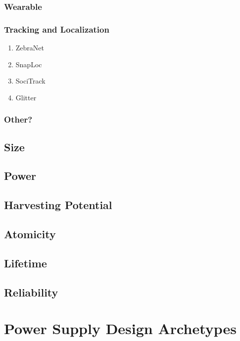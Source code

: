 \subsubsection{Wearable}
\subsubsection{Tracking and Localization}
\begin{enumerate}
    \item ZebraNet ~\cite{juang2002energy}
    \item SnapLoc ~\cite{grossiwindhager2019snaploc}
    \item SociTrack ~\cite{biri2020socitrack}
    \item Glitter ~\cite{sharma2020all}
\end{enumerate}
\subsubsection{Other?}

\subsection{Size}

\subsection{Power}

\subsection{Harvesting Potential}

\subsection{Atomicity}

\subsection{Lifetime}

\subsection{Reliability}





\section{Power Supply Design Archetypes}

